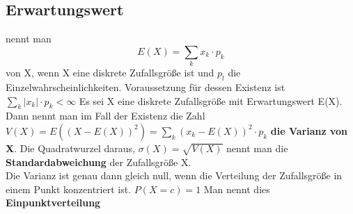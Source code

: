 \documentclass[german]{latex4ei/latex4ei_sheet}
\begin{document}
\begin{sectionbox}
\subsection{Erwartungswert} 
nennt man $$E(X) = \sum_{k} x_k \cdot p_k$$ von X, wenn X eine diskrete Zufallsgröße ist und $p_l$ die Einzelwahrscheinlichkeiten. Voraussetzung für dessen Existenz ist $\sum_{k}|x_k| \cdot p_k
< \infty$
\newline
Es sei X eine diskrete Zufallsgröße mit Erwartungswert E(X). Dann nennt man im Fall der Existenz die Zahl $ V(X) = E((X-E(X))^2) = \sum_ {k}(x_k - E(X))^2 \cdot p_k$
\textbf{die Varianz von X}. Die Quadratwurzel daraus, $\sigma(X) = \sqrt{V(X)} $ nennt man die \textbf{Standardabweichung} der Zufallsgröße X.\\
Die Varianz ist genau dann gleich null, wenn die Verteilung der Zufallsgröße in einem Punkt konzentriert ist. $P(X=c)=1$ Man nennt dies \textbf{Einpunktverteilung}\\

\end{sectionbox}
\end{document}
